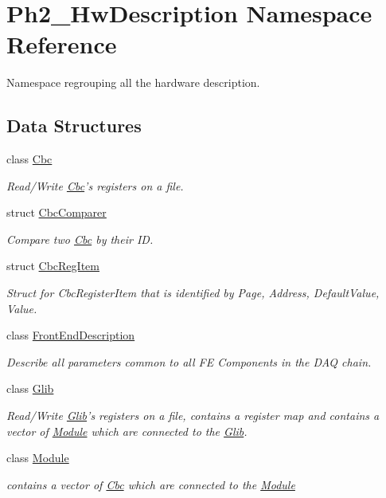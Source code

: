 \hypertarget{namespace_ph2___hw_description}{\section{Ph2\-\_\-\-Hw\-Description Namespace Reference}
\label{namespace_ph2___hw_description}
}


Namespace regrouping all the hardware description.  


\subsection*{Data Structures}
\begin{DoxyCompactItemize}
\item 
class \hyperlink{class_ph2___hw_description_1_1_cbc}{Cbc}
\begin{DoxyCompactList}\small\item\em Read/\-Write \hyperlink{class_ph2___hw_description_1_1_cbc}{Cbc}'s registers on a file. \end{DoxyCompactList}\item 
struct \hyperlink{struct_ph2___hw_description_1_1_cbc_comparer}{Cbc\-Comparer}
\begin{DoxyCompactList}\small\item\em Compare two \hyperlink{class_ph2___hw_description_1_1_cbc}{Cbc} by their I\-D. \end{DoxyCompactList}\item 
struct \hyperlink{struct_ph2___hw_description_1_1_cbc_reg_item}{Cbc\-Reg\-Item}
\begin{DoxyCompactList}\small\item\em Struct for Cbc\-Register\-Item that is identified by Page, Address, Default\-Value, Value. \end{DoxyCompactList}\item 
class \hyperlink{class_ph2___hw_description_1_1_front_end_description}{Front\-End\-Description}
\begin{DoxyCompactList}\small\item\em Describe all parameters common to all F\-E Components in the D\-A\-Q chain. \end{DoxyCompactList}\item 
class \hyperlink{class_ph2___hw_description_1_1_glib}{Glib}
\begin{DoxyCompactList}\small\item\em Read/\-Write \hyperlink{class_ph2___hw_description_1_1_glib}{Glib}'s registers on a file, contains a register map and contains a vector of \hyperlink{class_ph2___hw_description_1_1_module}{Module} which are connected to the \hyperlink{class_ph2___hw_description_1_1_glib}{Glib}. \end{DoxyCompactList}\item 
class \hyperlink{class_ph2___hw_description_1_1_module}{Module}
\begin{DoxyCompactList}\small\item\em contains a vector of \hyperlink{class_ph2___hw_description_1_1_cbc}{Cbc} which are connected to the \hyperlink{class_ph2___hw_description_1_1_module}{Module} \end{DoxyCompactList}\end{DoxyCompactItemize}
